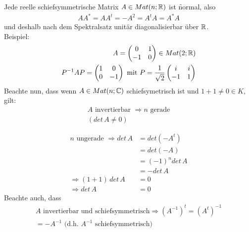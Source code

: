 Jede reelle schiefsymmetrische Matrix $A \in Mat(n; \mathbb{R})$ ist \f{normal}, also
\begin{align}
A A^{*} = A A^{t} = -A^{2} = A^{t} A = A^{*} A
\end{align}
und deshalb nach dem Spektralsatz unitär diagonalisierbar über $\mathbb{R}$.\\
Beispiel:
\begin{align}
A = \begin{pmatrix} 0 & 1 \\ -1 & 0 \end{pmatrix} \in Mat(2; \mathbb{R}) \\
P^{-1} A P = \begin{pmatrix} 1 & 0 \\ 0 & -1 \end{pmatrix} \text{ mit } P = \frac{1}{\sqrt{2}} \begin{pmatrix}i & i \\ -1 & 1\end{pmatrix}
\end{align}
Beachte nun, dass wenn $A \in Mat(n; \mathbb{C})$ schiefsymetrisch ist und $1+1 \neq 0 \in K$, gilt:
\begin{align}
A \text{ invertierbar } \Rightarrow n \text{ gerade} \\
(det\, A \neq 0)
\end{align}

\begin{align}
n \text{ ungerade } \Rightarrow det\, A &= det(-A^t) \\
&= det(-A) \\
&= (-1)^n det\, A \\
&= -det\, A \\
\Rightarrow (1+1)\, det\, A &= 0 \\
\Rightarrow det\, A &= 0
\end{align}
Beachte auch, dass
\begin{align}
A \text{ invertierbar und schiefsymmetrisch} \Rightarrow (A^{-1})^t = (A^t)^{-1} \\
= -A^{-1} \text{ (d.h. $A^{-1}$ schiefsymmetrisch)}
\end{align}

